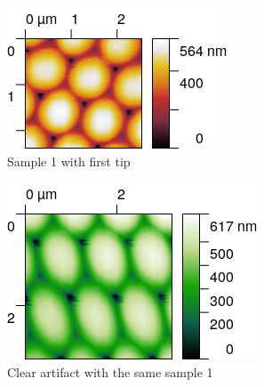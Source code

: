 \documentclass[11pt,a4paper]{article}
\begin{document}
\begin{figure}[H]
\centering
\begin{subfigure}[b]{0.45\textwidth}
\includegraphics[width=\textwidth]{sm_sample1}
\caption{Sample 1 with first tip}
\label{fig:sample1_first_tip}
\end{subfigure}
\begin{subfigure}[b]{0.45\textwidth}
\includegraphics[width=\textwidth]{sm_sample1_dir2}
\caption{Clear artifact with the same sample 1}
\label{fig:sample1_second_tip}
\end{subfigure}\\\vspace{.2cm}
\begin{subfigure}[b]{0.45\textwidth}

\end{subfigure}
\end{figure}
\end{document}
